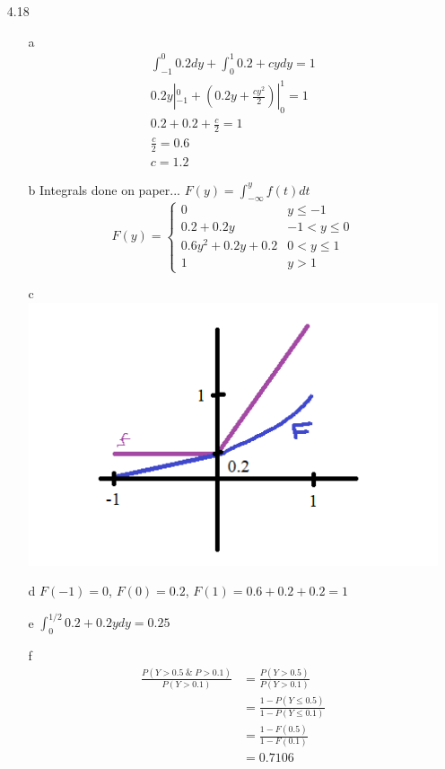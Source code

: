 \documentclass[11pt]{article}
\begin{document}
\begin{enumerate}
        \item[4.18]
        \begin{enumerate}
            \item[a]
            \begin{align*}
                \int_{-1}^0 0.2 dy + \int_0^1 0.2 + cy dy = 1 \\
                0.2y |_{-1}^0 + (0.2y + \frac{cy^2}{2}) |_0^1 = 1 \\
                0.2 + 0.2 + \frac{c}{2} = 1 \\
                \frac{c}{2} = 0.6 \\
                c = 1.2
            \end{align*}
            \item[b] Integrals done on paper... $F(y) = \int_{-\infty}^y f(t) dt$
            \[
                F(y) = \begin{cases}
                           0 & y \leq -1 \\
                           0.2+0.2y & -1 < y \leq 0 \\
                           0.6y^2 + 0.2y + 0.2 & 0 < y \leq 1 \\
                           1 & y > 1
                \end{cases}
            \]
            \item[c]
            \includegraphics{4.18c.png}
            \item[d] $F(-1) = 0$, $F(0) = 0.2$, $F(1) = 0.6 + 0.2 + 0.2 = 1$
            \item[e] $\int_0^{1/2} 0.2 + 0.2y dy = 0.25$
            \item[f]
            \begin{align*}
                \frac{P(Y > 0.5 \;\&\; P > 0.1)}{P(Y > 0.1)} &= \frac{P(Y > 0.5)}{P(Y > 0.1)} \\
                &= \frac{1 - P(Y \leq 0.5)}{1 - P(Y \leq 0.1)} \\
                &= \frac{1 - F(0.5)}{1 - F(0.1)} \\
                &= 0.7106
            \end{align*}
        \end{enumerate}


\end{enumerate}
\end{document}
